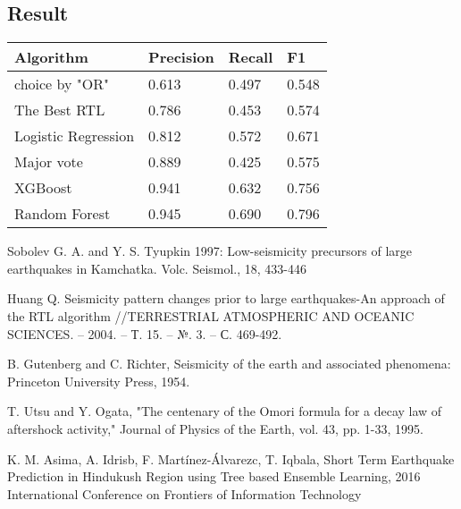 \documentclass[12pt]{article}
\begin{document}
\subsection{Result}
\begin{center}
    \begin{tabular}{| l | l | l | l |}
    \hline
    Algorithm & Precision & Recall & F1 \\ \hline
    choice by "OR"& 0.613 & 0.497 & 0.548  \\ \hline
    The Best RTL & 0.786 & 0.453 & 0.574 \\ \hline
    Logistic Regression & 0.812 & 0.572 & 0.671  \\ \hline
    Major vote      & 0.889 & 0.425 & 0.575  \\ \hline
    XGBoost & 0.941 & 0.632 & 0.756  \\ \hline
    Random Forest & 0.945 & 0.690 & 0.796  \\ \hline
    \end{tabular}
\end{center}
\begin{thebibliography}{9}

Sobolev G. A. and Y. S. Tyupkin 1997: Low-seismicity precursors of large earthquakes in Kamchatka. Volc. Seismol., 18, 433-446 

Huang Q. Seismicity pattern changes prior to large earthquakes-An approach of the RTL algorithm //TERRESTRIAL ATMOSPHERIC AND OCEANIC SCIENCES. – 2004. – Т. 15. – №. 3. – С. 469-492.

B. Gutenberg and C. Richter, Seismicity of the earth and associated phenomena: Princeton University Press, 1954.

T. Utsu and Y. Ogata, "The centenary of the Omori formula for a decay law of aftershock activity," Journal of Physics of the Earth, vol. 43, pp. 1-33, 1995. 

K. M. Asima, A. Idrisb, F. Martínez-Álvarezc, T. Iqbala, Short Term Earthquake Prediction in Hindukush Region using Tree based Ensemble Learning, 2016 International Conference on Frontiers of Information Technology
\end{thebibliography}
\end{document}
